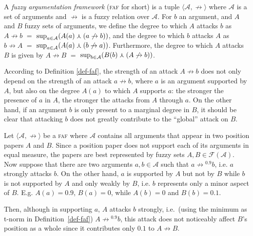 \documentclass[12pt,a4paper]{article}
\newcommand{\mc}[1]{\ensuremath{\mathcal{#1}}}
\newcommand{\abfaf}{\textsc{faf}}
\newcommand{\attack}{\ensuremath{\not\rightarrow}}
\newcommand{\af}[2]{\ensuremath{\langle{#1},{#2}\rangle}}
\newcommand{\Fuzzy}[1]{\ensuremath{\mc{F}({#1})}}
\newcommand{\Lattice}{\ensuremath{\mc{L}}}
\newcommand{\fand}{\ensuremath{\curlywedge}}
\begin{document}
\begin{definition}\label{def-faf}
A \emph{fuzzy argumentation framework} (\abfaf{} for short) is a tuple
$\af{\mc{A}}{\attack}$ where \mc{A} is a set of arguments and \attack{}
is a fuzzy relation over $\mc{A}$.
For $b$ an argument, and $A$ and $B$ fuzzy sets of arguments, we define the degree to which $A$ attacks $b$ as 
$A\attack{}b$ $=$ $\suprof{a\in\mc{A}}{A(a) \fand (a\attack{}b)}$,
and the degree to which $b$ attacks $A$ as
$b\attack{}A$ $=$ $\suprof{a\in\mc{A}}{A(a) \fand (b\attack{}a)}$.
Furthermore, the degree to which $A$ attacks $B$ is given by
$A\attack{}B$ $=$ $\suprof{b\in\mc{A}}{B(b) \fand (A\attack{}b)}$.
\end{definition}
According to Definition \ref{def-faf}, the strength of an attack $A\attack{}b$ does not only depend on the strength of an attack $a\attack{}b$, where $a$ is an argument supported by $A$, but also on the degree $A(a)$ to which $A$ supports $a$: the stronger the presence of $a$ in $A$, the stronger the attacks from $A$ through $a$. On the other hand, if an argument $b$ is only present to a marginal degree in $B$, it should be clear that attacking $b$ does not greatly contribute to the ``global'' attack on $B$. 


\begin{example}\label{fuzzy-doc}
Let \af{\mc{A}}{\attack} be a \abfaf{} where \mc{A} contains
all arguments that appear in two position papers $A$ and $B$.
Since a position paper does not support each of its arguments in
equal measure, the papers are best represented by fuzzy sets
$A,B\in\Fuzzy{\mc{A}}$. Now suppose that there are two arguments
$a,b\in\mc{A}$ such that $a\attack{}^{0.9} b$, i.e. $a$ strongly
attacks $b$. On the other hand, $a$ is supported by $A$ but
not by $B$ while $b$ is not supported by $A$ and only weakly
by $B$, i.e. $b$ represents only a minor aspect of $B$. 
E.g. $A(a) = 0.9$, $B(a) = 0$, while $A(b) = 0$ and $B(b) = 0.1$.
\par
Then, although in supporting $a$, $A$ attacks $b$ strongly, i.e.~(using the minimum as t-norm in Definition~\ref{def-faf}) $A \attack{}^{0.9} b$, this attack does not noticeably affect $B$'s position as a whole since it contributes only $0.1$ to $A\attack{} B$.
\end{example}
\end{document}
